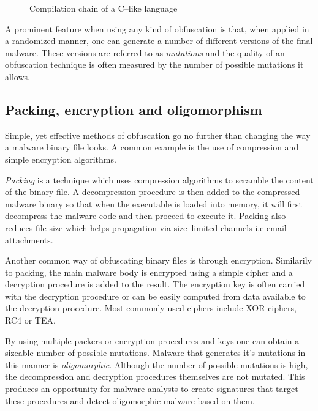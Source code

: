 \begin{figure}[H]
    \centering
    \caption{Compilation chain of a C--like language}
    \label{fig_comp}
\end{figure}

A prominent feature when using any kind of obfuscation is that, when applied in a randomized manner, one can generate a number of different versions of the final malware. These versions are referred to as \emph{mutations} and the quality of an obfuscation technique is often measured by the number of possible mutations it allows.

\subsection{Packing, encryption and oligomorphism}
Simple, yet effective methods of obfuscation go no further than changing the way a malware binary file looks. A common example is the use of compression and simple encryption algorithms.

\emph{Packing} is a technique which uses compression algorithms to scramble the content of the binary file\cite{Symatec08}. A decompression procedure is then added to the compressed malware binary so that when the executable is loaded into memory, it will first decompress the malware code and then proceed to execute it. Packing also reduces file size which helps propagation via size--limited channels i.e email attachments. 

Another common way of obfuscating binary files is through encryption. Similarily to packing, the main malware body is encrypted using a simple cipher and a decryption procedure is added to the result. The encryption key is often carried with the decryption procedure or can be easily computed from data available to the decryption procedure. Most commonly used ciphers include XOR ciphers, RC4 or TEA. 

By using multiple packers or encryption procedures and keys one can obtain a sizeable number of possible mutations. Malware that generates it's mutations in this manner is \emph{oligomorphic}. Although the number of possible mutations is high, the decompression and decryption procedures themselves are not mutated. This produces an opportunity for malware analysts to create signatures that target these procedures and detect oligomorphic malware based on them.

